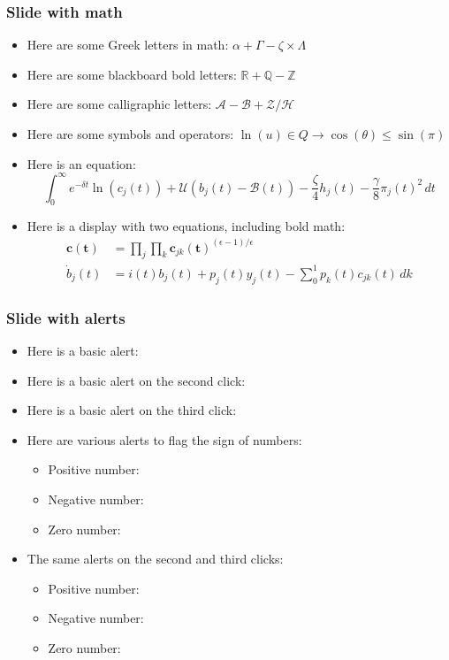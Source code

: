 \documentclass[11pt,xcolor={dvipsnames},hyperref={pdftex,pdfpagemode=UseNone,hidelinks,pdfdisplaydoctitle=true},usepdftitle=false]{beamer}
\begin{document}
\begin{frame}
\end{frame}

\begin{frame}
\frametitle{Slide with math}
\begin{itemize}
\item Here are some Greek letters in math: $\alpha + \Gamma - \zeta \times \Lambda$
\item Here are some blackboard bold letters: $\mathbb{R} + \mathbb{Q} - \mathbb{Z}$
\item Here are some calligraphic letters: $\mathcal{A} - \mathcal{B} + \mathcal{Z} / \mathcal{H}$
\item Here are some symbols and operators: $\ln(u) \in Q \to \cos(\theta) \leq \sin(\pi)$
\item Here is an equation:
\begin{equation*}
\int_{0}^{\infty}e^{-\delta t} \ln(c_{j}(t))+ \mathcal{U}(b_{j}(t) - \mathcal{B}(t))- \frac{\zeta}{4} h_{j}(t) -\frac{\gamma}{8} \pi_{j}(t)^2\,dt
\end{equation*}
\item Here is a display with two equations, including bold math:
\begin{align*}
\bm{c}(\bm{t}) &= \prod_{j} \prod_{k} \bm{c}_{jk}(\bm{t})^{(\epsilon-1)/\epsilon} \\
\dot{b}_{j}(t) &= i(t) b_{j}(t) + p_{j}(t)  y_{j}(t) - \sum_0^1 p_{k}(t) c_{jk}(t)\,dk
\end{align*}
\end{itemize}
\end{frame}

\begin{frame}
\frametitle{Slide with alerts}
\begin{itemize}
\item Here is a basic alert: 
\item Here is a basic alert on the second click: 
\item Here is a basic alert on the third click: 
\item Here are various alerts to flag the sign of numbers:
\begin{itemize}
\item Positive number: 
\item Negative number: 
\item Zero number: 
\end{itemize}
\item The same alerts on the second and third clicks:
\begin{itemize}
\item Positive number: 
\item Negative number: 
\item Zero number: 
\end{itemize}
\end{itemize}
\end{frame}
\end{document}
